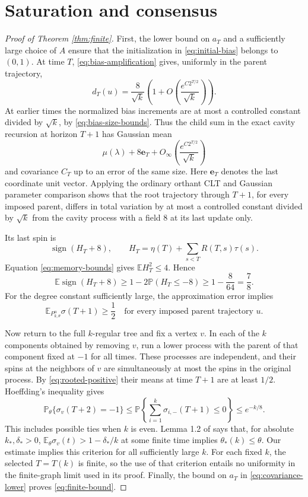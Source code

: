 \documentclass[11pt]{article}
\theoremstyle{remark}\newtheorem{remark}[theorem]{Remark}
\newcommand{\E}{\mathbb E}
\newcommand{\Pp}{\mathbb P}
\newcommand{\sign}{\operatorname{sign}}
\begin{document}
\section{Saturation and consensus}
\begin{proof}[Proof of Theorem \ref{thm:finite}]
First, the lower bound on $a_T$ and a sufficiently large choice of $A$
ensure that the initialization in \eqref{eq:initial-bias} belongs to $(0,1)$.
At time $T$, \eqref{eq:bias-amplification} gives, uniformly in the parent
trajectory,
\[
 d_T(u)=\frac8{\sqrt k}
   \left(1+O\!\left(\frac{e^{C2^{T/2}}}{\sqrt k}\right)\right).
\]
At earlier times the normalized bias increments are at most a controlled
constant divided by $\sqrt k$, by \eqref{eq:bias-size-bounds}.
Thus the child sum in the exact cavity recursion at horizon $T+1$ has
Gaussian mean
\[
 \mu(\lambda)+8\mathbf e_T+
       O_\infty\!\left(\frac{e^{C2^{T/2}}}{\sqrt k}\right)
\]
and covariance $C_T$ up to an error of the same size.
Here $\mathbf e_T$ denotes the last coordinate unit vector.
Applying the ordinary orthant CLT and Gaussian parameter comparison shows
that the root trajectory through $T+1$, for every imposed parent, differs
in total variation by at most a controlled constant divided by $\sqrt k$
from the cavity process with a field $8$ at its last update only.

Its last spin is
\[
 \sign(H_T+8),\qquad
 H_T=\eta(T)+\sum_{s<T}R(T,s)\tau(s).
\]
Equation \eqref{eq:memory-bounds} gives $\E H_T^2\le4$. Hence
\[
 \E\sign(H_T+8)\ge1-2\Pp(H_T\le-8)\ge1-\frac8{64}=\frac78.
\]
For the degree constant sufficiently large, the approximation error
implies
\begin{equation}\label{eq:rooted-positive}
 \E_{P_{k,\theta}^{u}}\sigma(T+1)\ge\frac12
 \quad\text{for every imposed parent trajectory }u.
\end{equation}

Now return to the full $k$-regular tree and fix a vertex $v$.
In each of the $k$ components obtained by removing $v$, run a lower process
with the parent of that component fixed at $-1$ for all times.
These processes are independent, and their spins at the neighbors of $v$
are simultaneously at most the spins in the original process.
By \eqref{eq:rooted-positive} their means at time $T+1$ are at least $1/2$.
Hoeffding's inequality gives
\[
 \Pp_\theta\{\sigma_v(T+2)=-1\}
 \le\Pp\!\left\{\sum_{i=1}^k\sigma_{i,-}(T+1)\le0\right\}
 \le e^{-k/8}.
\]
This includes possible ties when $k$ is even.
Lemma 1.2 of \cite{KM} says that, for absolute $k_*,\delta_*>0$,
$\E_\theta\sigma_v(t)>1-\delta_*/k$ at some finite time implies
$\theta_*(k)\le\theta$. Our estimate implies this criterion for all
sufficiently large $k$. For each fixed $k$, the selected $T=T(k)$ is
finite, so the use of that criterion entails no uniformity in the
finite-graph limit used in its proof. Finally, the bound on $a_T$ in
\eqref{eq:covariance-lower} proves \eqref{eq:finite-bound}.
\end{proof}
\end{document}
